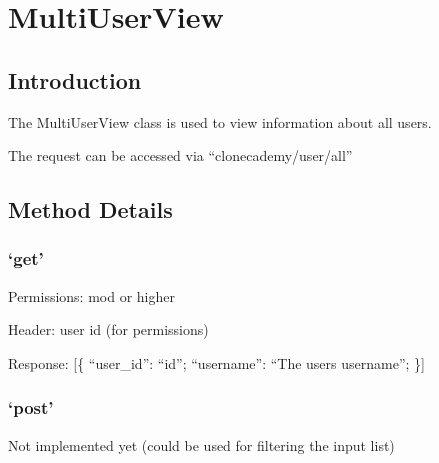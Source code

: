 \chapter*{MultiUserView}

\section*{Introduction}\label{introduction}

The MultiUserView class is used to view information about all users.

The request can be accessed via ``clonecademy/user/all''

\section*{Method Details}\label{method-details}

\subsection*{\texorpdfstring{`get'}{get}}\label{get}

Permissions: mod or higher

Header: user id (for permissions)

Response: {[}\{ ``user\_id'': ``id''; ``username'': ``The users
username''; \}{]}

\subsection*{\texorpdfstring{`post'}{post}}\label{post}

Not implemented yet (could be used for filtering the input list)
